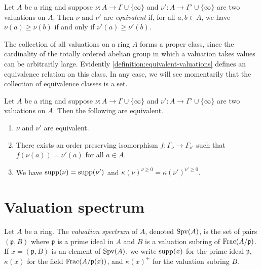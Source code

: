\begin{definition}
\label{definition:equivalent-valuations}
Let $A$ be a ring and suppose $\nu : A \to \Gamma \cup \{\infty\}$ and $\nu' : A \to \Gamma' \cup \{\infty\}$ are two valuations on $A$. Then $\nu$ and $\nu'$ are \emph{equivalent} if, for all $a, b \in A$, we have $\nu(a) \geq \nu(b)$ if and only if $\nu'(a) \geq \nu'(b)$. 
\end{definition}

\begin{remark}
The collection of all valuations on a ring $A$ forms a proper class, since the cardinality of the totally ordered abelian group in which a valuation takes values can be arbitrarily large. Evidently \cref{definition:equivalent-valuations} defines an equivalence relation on this class. In any case, we will see momentarily that the collection of equivalence classes is a set. 
\end{remark}

\begin{lemma}
Let $A$ be a ring and suppose $\nu : A \to \Gamma \cup \{\infty\}$ and $\nu' : A \to \Gamma' \cup \{\infty\}$ are two valuations on $A$. Then the following are equivalent. 
\begin{enumerate}[label=(\alph{*})]
\item $\nu$ and $\nu'$ are equivalent. 
\item There exists an order preserving isomorphism $f : \Gamma_\nu \to \Gamma_{\nu'}$ such that $f(\nu(a)) = \nu'(a)$ for all $a \in A$.
\item We have $\operatorname{supp}(\nu) = \operatorname{supp}(\nu')$ and $\kappa(\nu)^{\nu \geq 0} = \kappa(\nu')^{\nu' \geq 0}$. 
\end{enumerate}
\end{lemma}

\section{Valuation spectrum}

\begin{definition}
Let $A$ be a ring. The \emph{valuation spectrum} of $A$, denoted $\operatorname{Spv}(A)$, is the set of pairs $(\mathfrak{p},B)$ where $\mathfrak{p}$ is a prime ideal in $A$ and $B$ is a valuation subring of $\operatorname{Frac}(A/\mathfrak{p})$. If $x = (\mathfrak{p}, B)$ is an element of $\operatorname{Spv}(A)$, we write $\operatorname{supp}(x)$ for the prime ideal $\mathfrak{p}$, $\kappa(x)$ for the field $\operatorname{Frac}(A/\mathfrak{p}(x))$, and $\kappa(x)^+$ for the valuation subring $B$. 
\end{definition}

